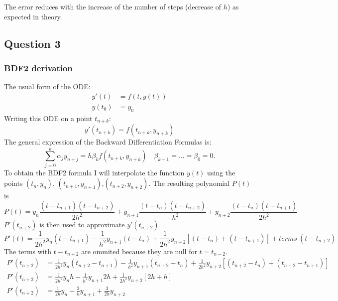 \documentclass[a4paper, 11pt]{article}
\begin{document}
		The error reduces with the increase of the number of steps (decrease of $h$) as expected in theory.		
		
		\subsection*{Question 3}
			\subsubsection*{BDF2 derivation}
				The usual form of the ODE:
				\begin{align}
					y'(t) &= f(t, y(t)) \\
					y(t_0) &= y_0
				\end{align}
				Writing this ODE on a point $t_{n+k}$:
				\begin{equation}
					y'(t_{n+k}) = f(t_{n+k}, y_{n+k}) 
				\end{equation}
				The general expression of the Backward Differentiation Formulas is:
				\begin{equation}
					\sum_{j=0}^{k}\alpha_j y_{n+j} = h \beta_k f(t_{n+k}, y_{n+k}) \quad \beta_{k-1} = \ldots = \beta_0 = 0.
				\end{equation}
				To obtain the BDF2 formula I will interpolate the function $y(t)$ using the points $(t_{n}, y_{n})$, $(t_{n+1}, y_{n+1})$,$(t_{n+2}, y_{n+2})$.
				The resulting polynomial $P(t)$ is
				\begin{equation}
					P(t) = y_n \frac{(t - t_{n+1})(t - t_{n+2})}{2h^2} + y_{n+1} \frac{(t - t_n)(t - t_{n+2})}{-h^2} + y_{n+2} \frac{(t - t_n)(t - t_{n+1})}{2h^2}
				\end{equation}
				$P'(t_{n+2})$ is then used to approximate $y'(t_{n+2})$
				\begin{equation}
					P'(t) = \frac{1}{2h^2} y_n(t-t_{n+1}) - \frac{1}{h^2} y_{n+1}(t-t_{n}) + \frac{1}{2h^2} y_{n+2}[(t-t_{n})+(t-t_{n+1})] + terms \ (t-t_{n+2})
				\end{equation}
				The terms with $t-t_{n+2}$ are ommited because they are null for $t = t_{n-2}$.
				\begin{align}
					P'(t_{n+2}) &= \frac{1}{2h^2} y_n(t_{n+2}-t_{n+1}) - \frac{1}{h^2} y_{n+1}(t_{n+2}-t_{n}) + \frac{1}{2h^2} y_{n+2}[(t_{n+2}-t_{n})+(t_{n+2}-t_{n+1})] \\
					P'(t_{n+2}) &= \frac{1}{2h^2} y_n h - \frac{1}{h^2} y_{n+1} 2h + \frac{1}{2h^2} y_{n+2}[2h+h] \\
					P'(t_{n+2}) &= \frac{1}{2h} y_n - \frac{2}{h} y_{n+1} + \frac{3}{2h} y_{n+2} \\
				\end{align}
\end{document}
